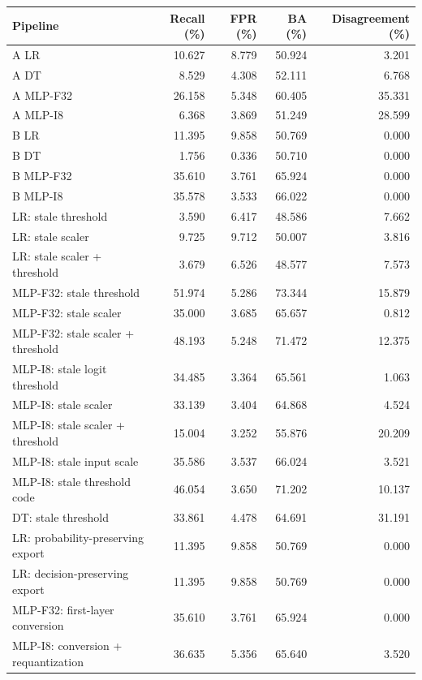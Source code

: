 \begin{tabular}{lrrrr}
\toprule
Pipeline & Recall (\%) & FPR (\%) & BA (\%) & Disagreement (\%) \\
\midrule
A LR & 10.627 & 8.779 & 50.924 & 3.201 \\
A DT & 8.529 & 4.308 & 52.111 & 6.768 \\
A MLP-F32 & 26.158 & 5.348 & 60.405 & 35.331 \\
A MLP-I8 & 6.368 & 3.869 & 51.249 & 28.599 \\
\midrule
B LR & 11.395 & 9.858 & 50.769 & 0.000 \\
B DT & 1.756 & 0.336 & 50.710 & 0.000 \\
B MLP-F32 & 35.610 & 3.761 & 65.924 & 0.000 \\
B MLP-I8 & 35.578 & 3.533 & 66.022 & 0.000 \\
\midrule
LR: stale threshold & 3.590 & 6.417 & 48.586 & 7.662 \\
LR: stale scaler & 9.725 & 9.712 & 50.007 & 3.816 \\
LR: stale scaler + threshold & 3.679 & 6.526 & 48.577 & 7.573 \\
MLP-F32: stale threshold & 51.974 & 5.286 & 73.344 & 15.879 \\
MLP-F32: stale scaler & 35.000 & 3.685 & 65.657 & 0.812 \\
MLP-F32: stale scaler + threshold & 48.193 & 5.248 & 71.472 & 12.375 \\
MLP-I8: stale logit threshold & 34.485 & 3.364 & 65.561 & 1.063 \\
MLP-I8: stale scaler & 33.139 & 3.404 & 64.868 & 4.524 \\
MLP-I8: stale scaler + threshold & 15.004 & 3.252 & 55.876 & 20.209 \\
MLP-I8: stale input scale & 35.586 & 3.537 & 66.024 & 3.521 \\
MLP-I8: stale threshold code & 46.054 & 3.650 & 71.202 & 10.137 \\
DT: stale threshold & 33.861 & 4.478 & 64.691 & 31.191 \\
\midrule
LR: probability-preserving export & 11.395 & 9.858 & 50.769 & 0.000 \\
LR: decision-preserving export & 11.395 & 9.858 & 50.769 & 0.000 \\
MLP-F32: first-layer conversion & 35.610 & 3.761 & 65.924 & 0.000 \\
MLP-I8: conversion + requantization & 36.635 & 5.356 & 65.640 & 3.520 \\
\bottomrule
\end{tabular}
